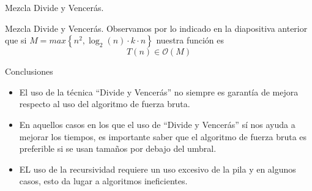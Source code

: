 \documentclass[10pt, xcolor=table]{beamer}
\begin{document}
\begin{frame}[fragile]{Mezcla Divide y Vencerás. }

\end{frame}

\begin{frame}[fragile]{Mezcla Divide y Vencerás. }
Observamos por lo indicado en la diapositiva anterior que si $M = max \left\lbrace n^2, \log_{2}(n) \cdot k \cdot n \right\rbrace $ nuestra función es
\[
	T(n) \in \mathcal{O}(M)
\]
\end{frame}



\begin{frame}{Conclusiones}

	\begin{itemize}
	\item El uso de la técnica ``Divide y Vencerás'' no siempre es garantía de mejora respecto al uso del algoritmo de fuerza bruta.
	
	\item En aquellos casos en los que el uso de ``Divide y Vencerás'' sí nos ayuda a mejorar los tiempos, es importante saber que el algoritmo de fuerza bruta es preferible si se usan tamaños por debajo del umbral.
	
	\item EL uso de la recursividad requiere un uso excesivo de la pila y en algunos casos, esto da lugar a algoritmos ineficientes.
	
		
\end{itemize}		
\end{frame}
\end{document}
